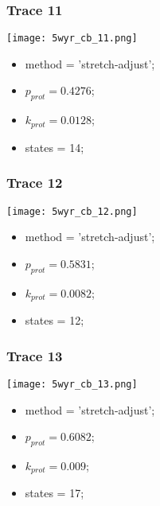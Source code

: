 \subsubsection{Trace 11}
\begin{minipage}[c]{0.7\textwidth}
    \texttt{[image: 5wyr\_cb\_11.png]}
\end{minipage}
\hfill
\begin{minipage}[c]{0.45\textwidth}
    \begin{itemize}
        \item method = 'stretch-adjust';
        \item $p_{prot}=0.4276$;
        \item $k_{prot}=0.0128$;
        \item states = 14;
    \end{itemize}
\end{minipage}

\subsubsection{Trace 12}
\begin{minipage}[c]{0.7\textwidth}
    \texttt{[image: 5wyr\_cb\_12.png]}
\end{minipage}
\hfill
\begin{minipage}[c]{0.45\textwidth}
    \begin{itemize}
        \item method = 'stretch-adjust';
        \item $p_{prot}=0.5831$;
        \item $k_{prot}=0.0082$;
        \item states = 12;
    \end{itemize}
\end{minipage}

\subsubsection{Trace 13}
\begin{minipage}[c]{0.7\textwidth}
    \texttt{[image: 5wyr\_cb\_13.png]}
\end{minipage}
\hfill
\begin{minipage}[c]{0.45\textwidth}
    \begin{itemize}
        \item method = 'stretch-adjust';
        \item $p_{prot}=0.6082$;
        \item $k_{prot}=0.009$;
        \item states = 17;
    \end{itemize}
\end{minipage}

